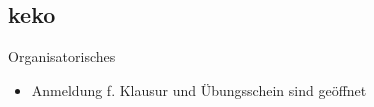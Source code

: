 \subsection{keko}
\begin{frame}{Organisatorisches}
    \begin{itemize}
    	\item Anmeldung f. Klausur und Übungsschein sind geöffnet
    \end{itemize}


\end{frame}